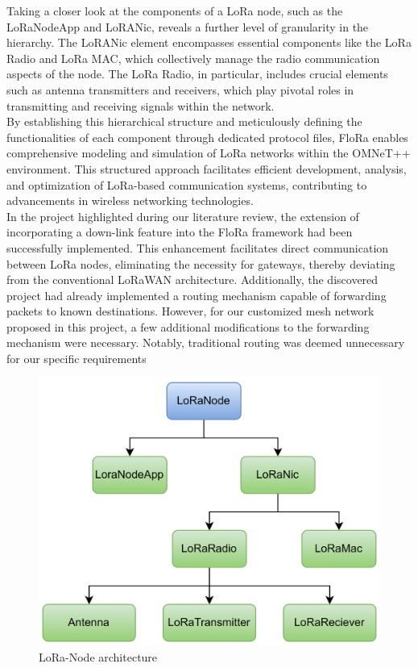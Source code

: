 Taking a closer look at the components of a LoRa node, such as the LoRaNodeApp and LoRANic, reveals a further level of granularity in the hierarchy. The LoRANic element encompasses essential components like the LoRa Radio and LoRa MAC, which collectively manage the radio communication aspects of the node. The LoRa Radio, in particular, includes crucial elements such as antenna transmitters and receivers, which play pivotal roles in transmitting and receiving signals within the network.\\

By establishing this hierarchical structure and meticulously defining the functionalities of each component through dedicated protocol files, FloRa enables comprehensive modeling and simulation of LoRa networks within the OMNeT++ environment. This structured approach facilitates efficient development, analysis, and optimization of LoRa-based communication systems, contributing to advancements in wireless networking technologies.\\

In the project highlighted during our literature review, the extension of incorporating a down-link feature into the FloRa framework had been successfully implemented. This enhancement facilitates direct communication between LoRa nodes, eliminating the necessity for gateways, thereby deviating from the conventional LoRaWAN architecture. Additionally, the discovered project had already implemented a routing mechanism capable of forwarding packets to known destinations. However, for our customized mesh network proposed in this project, a few additional modifications to the forwarding mechanism were necessary. Notably, traditional routing was deemed unnecessary for our specific requirements\\

            \begin{figure}[htp!]
                \centering
                \includegraphics[width=0.7\columnwidth]{images/a.drawio.jpg}
                \caption{LoRa-Node architecture}
                \label{fig:enter-label}
            \end{figure}
            
